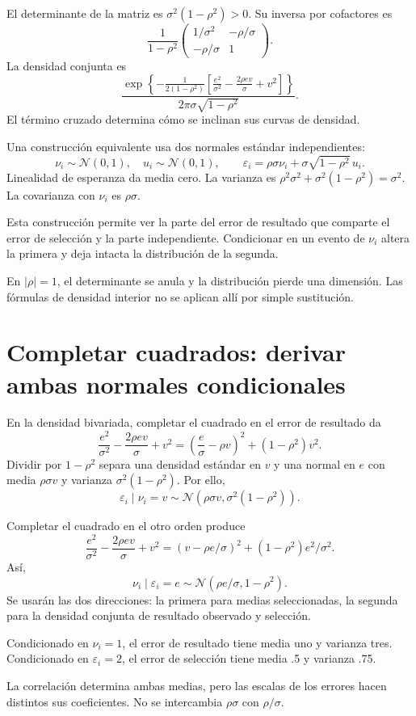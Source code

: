 \documentclass[11pt,a4paper]{article}
\begin{document}
El determinante de la matriz es
\(\sigma^2(1-\rho^2)>0\).
Su inversa por cofactores es
\[
\frac1{1-\rho^2}
\begin{pmatrix}
1/\sigma^2&-\rho/\sigma\\
-\rho/\sigma&1
\end{pmatrix}.
\]
La densidad conjunta es
\[
\frac{\exp\left\{
-\frac1{2(1-\rho^2)}
\left[\frac{e^2}{\sigma^2}
-\frac{2\rho ev}{\sigma}+v^2\right]\right\}}
{2\pi\sigma\sqrt{1-\rho^2}}.
\]
El término cruzado determina cómo
se inclinan sus curvas de densidad.

Una construcción equivalente usa
dos normales estándar independientes:
\[
\nu_i\sim\mathcal N(0,1),\quad u_i\sim\mathcal N(0,1),
\qquad
\varepsilon_i=\rho\sigma\nu_i
+\sigma\sqrt{1-\rho^2}\,u_i.
\]
Linealidad de esperanza da media cero.
La varianza es
\(\rho^2\sigma^2+\sigma^2(1-\rho^2)=\sigma^2\).
La covarianza con \(\nu_i\) es \(\rho\sigma\).

Esta construcción permite ver la parte
del error de resultado que comparte
el error de selección y la parte independiente.
Condicionar en un evento de \(\nu_i\)
altera la primera y deja intacta
la distribución de la segunda.

En \(|\rho|=1\), el determinante se anula
y la distribución pierde una dimensión.
Las fórmulas de densidad interior
no se aplican allí por simple sustitución.

\clearpage
\section{Completar cuadrados: derivar ambas normales condicionales}\label{unidad65}
En la densidad bivariada, completar
el cuadrado en el error de resultado da
\[
\frac{e^2}{\sigma^2}
-\frac{2\rho ev}{\sigma}+v^2
=\left(\frac e\sigma-\rho v\right)^2
+(1-\rho^2)v^2.
\]
Dividir por \(1-\rho^2\) separa
una densidad estándar en \(v\)
y una normal en \(e\) con media
\(\rho\sigma v\) y varianza
\(\sigma^2(1-\rho^2)\).
Por ello,
\[
\varepsilon_i\mid\nu_i=v
\sim\mathcal N(\rho\sigma v,\sigma^2(1-\rho^2)).
\]

Completar el cuadrado en el otro orden produce
\[
\frac{e^2}{\sigma^2}
-\frac{2\rho ev}{\sigma}+v^2
=(v-\rho e/\sigma)^2
+(1-\rho^2)e^2/\sigma^2.
\]
Así,
\[
\nu_i\mid\varepsilon_i=e
\sim\mathcal N(\rho e/\sigma,1-\rho^2).
\]
Se usarán las dos direcciones:
la primera para medias seleccionadas,
la segunda para la densidad conjunta
de resultado observado y selección.

\begin{ejemplo}
Condicionado en \(\nu_i=1\),
el error de resultado tiene media uno
y varianza tres.
Condicionado en \(\varepsilon_i=2\),
el error de selección tiene media .5
y varianza .75.
\end{ejemplo}
La correlación determina ambas medias,
pero las escalas de los errores
hacen distintos sus coeficientes.
No se intercambia \(\rho\sigma\)
con \(\rho/\sigma\).
\end{document}
